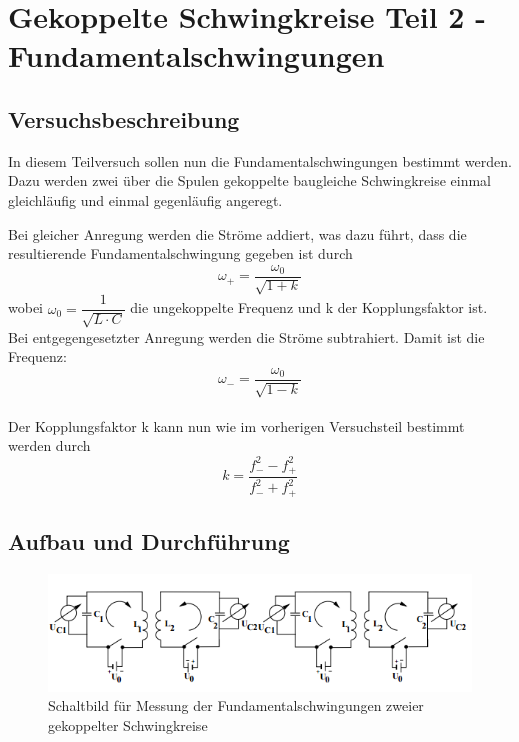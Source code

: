 \documentclass[12pt,a4paper]{article}
\begin{document}
\newpage
\section{Gekoppelte Schwingkreise Teil 2 - Fundamentalschwingungen}
\subsection{Versuchsbeschreibung}
In diesem Teilversuch sollen nun die Fundamentalschwingungen bestimmt werden. Dazu werden zwei über die Spulen gekoppelte baugleiche Schwingkreise einmal gleichläufig und einmal gegenläufig angeregt.

Bei gleicher Anregung werden die Ströme addiert, was dazu führt, dass die resultierende Fundamentalschwingung gegeben ist durch
\begin{equation}
\omega_+ =\dfrac{\omega_0}{\sqrt{1+k}}
\end{equation}
wobei $\omega_0 = \dfrac{1}{\sqrt{L\cdot C}}$ die ungekoppelte Frequenz und k der Kopplungsfaktor ist.\\
Bei entgegengesetzter Anregung werden die Ströme subtrahiert. Damit ist die Frequenz:
\begin{equation}
\omega_- =\dfrac{\omega_0}{\sqrt{1-k}}
\end{equation}
\\
Der Kopplungsfaktor k kann nun wie im vorherigen Versuchsteil bestimmt werden durch
\begin{equation}
k = \dfrac{f_-^2 - f_+^2}{f_-^2 + f_+^2}
\label{eq:Kopplung2}
\end{equation}

\subsection{Aufbau und Durchführung}

\begin{figure}
\begin{center}
\includegraphics[width=\linewidth]{Bilder/Fund_Aufbau.PNG}
\end{center}
\caption[Aufbau Schwebung]{Schaltbild für Messung der Fundamentalschwingungen zweier gekoppelter Schwingkreise}
\label{fig:Fund_Aufbau}
\end{figure}
\end{document}
